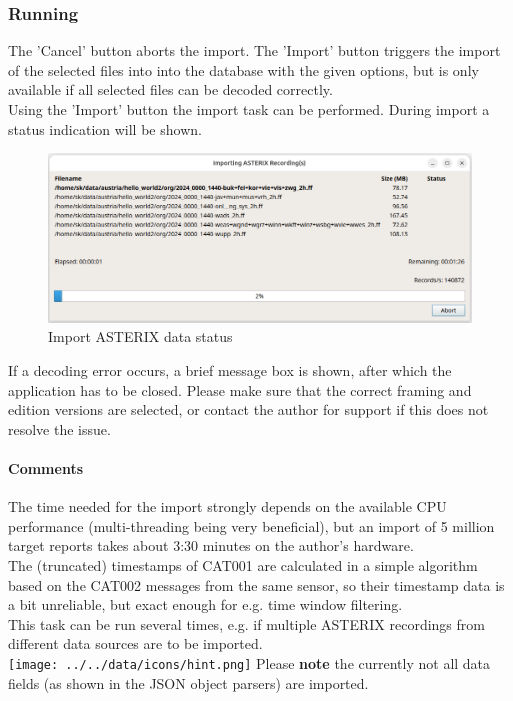 \subsubsection{Running}

The 'Cancel' button aborts the import.  The 'Import' button triggers the import of the selected files into into the database with the given options, but is only available if all selected files can be decoded correctly. \\

Using the 'Import' button the import task can be performed. During import a status indication will be shown. \\

\begin{figure}[H]
  \center
    \includegraphics[width=14cm]{figures/asterix_import_data_status.png}
  \caption{Import ASTERIX data status}
\end{figure}

If a decoding error occurs, a brief message box is shown, after which the application has to be closed. 
Please make sure that the correct framing and edition versions are selected, or contact the author for support if this does not resolve the issue. \\

\paragraph{Comments}
The time needed for the import strongly depends on the available CPU performance (multi-threading being very beneficial), but an import of 5 million target reports takes about 3:30 minutes on the author's hardware. \\

The (truncated) timestamps of CAT001 are calculated in a simple algorithm based on the CAT002 messages from the same sensor, so their timestamp data is a bit unreliable, but exact enough for e.g. time window filtering. \\

This task can be run several times, e.g. if multiple ASTERIX recordings from different data sources are to be imported. \\

\texttt{[image: ../../data/icons/hint.png]} Please \textbf{note} the currently not all data fields (as shown in the JSON object parsers) are imported.\\


